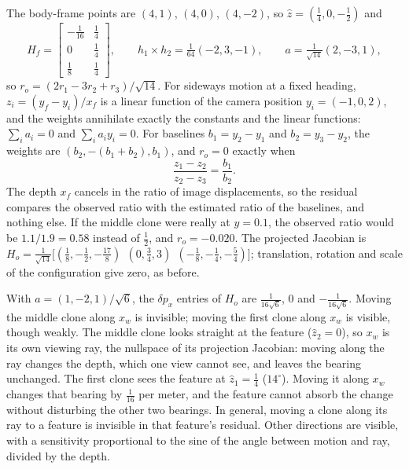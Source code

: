 \begin{solutions}
  \item The body-frame points are $(4, 1)$, $(4, 0)$, $(4, -2)$, so $\hat z = (\tfrac14, 0, -\tfrac12)$ and
        \[
          H_f = \begin{bmatrix} -\tfrac1{16} & \tfrac14 \\ 0 & \tfrac14 \\ \tfrac18 & \tfrac14 \end{bmatrix}, \qquad
          h_1\times h_2 = \tfrac1{64}(-2, 3, -1), \qquad a = \tfrac1{\sqrt{14}}(2, -3, 1),
        \]
        so $r_o = (2r_1 - 3r_2 + r_3)/\sqrt{14}$. For sideways motion at a fixed heading, $z_i = (y_f - y_i)/x_f$ is a linear function of the camera position $y_i = (-1, 0, 2)$, and
        the weights annihilate exactly the constants and the linear functions: $\sum_ia_i = 0$ and $\sum_ia_iy_i = 0$. For baselines $b_1 = y_2 - y_1$ and $b_2 = y_3 - y_2$, the weights are
        $(b_2, -(b_1 + b_2), b_1)$, and $r_o = 0$ exactly when
        \[
          \frac{z_1 - z_2}{z_2 - z_3} = \frac{b_1}{b_2} .
        \]
        The depth $x_f$ cancels in the ratio of image displacements, so the residual compares the observed ratio with the estimated ratio of the baselines, and
        nothing else. If the middle clone were really at $y = 0.1$, the observed ratio would be $1.1/1.9 = 0.58$ instead of $\tfrac12$, and $r_o = -0.020$. The projected Jacobian
        is $H_o = \tfrac1{\sqrt{14}}\big[(\tfrac18, -\tfrac12, -\tfrac{17}8)\ \ (0, \tfrac34, 3)\ \ (-\tfrac18, -\tfrac14, -\tfrac54)\big]$; translation, rotation and scale of the configuration give zero, as before.

  \item With $a = (1, -2, 1)/\sqrt6$, the $\delta p_x$ entries of $H_o$ are $\tfrac{1}{16\sqrt6}$, $0$ and $-\tfrac{1}{16\sqrt6}$. Moving the middle clone along $x_w$ is invisible; moving the first clone
        along $x_w$ is visible, though weakly. The middle clone looks straight at the feature ($\hat z_2 = 0$), so $x_w$ is its own viewing ray, the nullspace of its projection
        Jacobian: moving along the ray changes the depth, which one view cannot see, and leaves the bearing unchanged. The first clone sees the feature at
        $\hat z_1 = \tfrac14$ ($14^\circ$). Moving it along $x_w$ changes that bearing by $\tfrac{1}{16}$ per meter, and the feature cannot absorb the change without disturbing the other two bearings. In
        general, moving a clone along its ray to a feature is invisible in that feature's residual. Other directions are visible, with a sensitivity
        proportional to the sine of the angle between motion and ray, divided by the depth.


\end{solutions}
